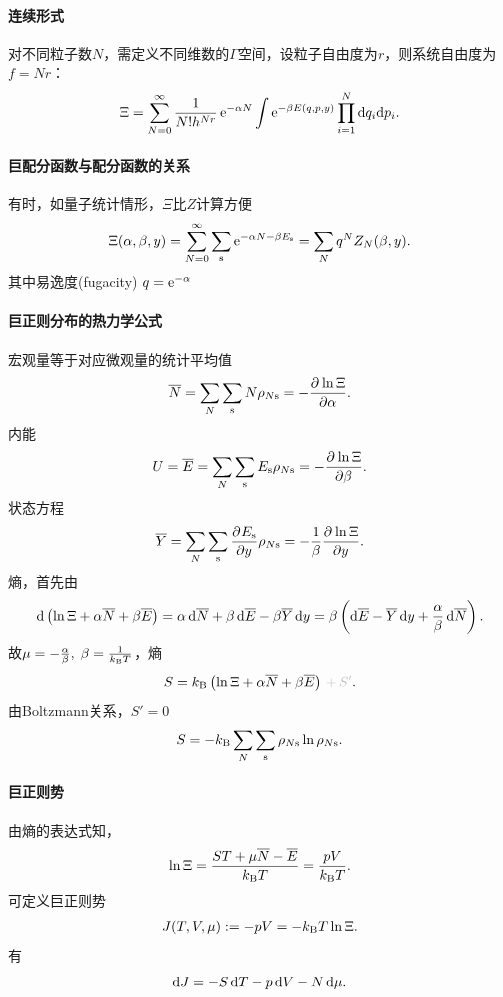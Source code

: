 \paragraph{连续形式}对不同粒子数$N$，需定义不同维数的$\Gamma$空间，设粒子自由度为$r$，则系统自由度为$f=Nr$：
\begin{align}
	\Xi=\sum_{N=0}^\infty\frac1{N!h^{Nr}}\e{-\alpha N}\int\e{-\beta E(q,p,y)}\prod_{i=1}^N\d q_i\nd p_i.
\end{align}
\paragraph{巨配分函数与配分函数的关系}有时，如量子统计情形，$\Xi$比$Z$计算方便
\[
	\Xi(\alpha,\beta,y)=\sum_{N=0}^\infty\sum_\st\e{-\alpha N-\beta E_\st}=\sum_Nq^NZ_N(\beta,y).
\]
其中易逸度(fugacity) $q=\e{-\alpha}$

\paragraph{巨正则分布的热力学公式}宏观量等于对应微观量的统计平均值
\begin{align}
	\avg N=\sum_N\sum_\st N\rho_{N\st}=-\pv{\ln\Xi}\alpha.
\end{align}
内能
\begin{align}
	U=\avg E=\sum_N\sum_\st E_\st\rho_{N\st}=-\pv{\ln\Xi}\beta.
\end{align}
状态方程
\begin{align}
	\avg Y=\sum_N\sum_\st\pv{E_\st}y\rho_{N\st}=-\frac1\beta\pv{\ln\Xi}y.
\end{align}
熵，首先由
\begin{align*}
	\d\kh{\ln\Xi+\alpha\avg N+\beta\avg E}=\alpha\d\avg N+\beta\d\avg E-\beta\avg Y\d y=\beta\kh{\d\avg E-\avg Y\d y+\frac\alpha\beta\d\avg N}.
\end{align*}
故$\mu=-\frac\alpha\beta,\;\beta=\frac1{\kB T}$，熵
\begin{align}
	S=\kB\kh{\ln\Xi+\alpha\avg N+\beta\avg E}{\color{lightgray}\,+\,S'}.
\end{align}
由Boltzmann关系，$S'=0$
\begin{align}
	S=-\kB\sum_N\sum_\st\rho_{N\st}\ln\rho_{N\st}.
\end{align}
\paragraph{巨正则势}
由熵的表达式知，
\[
	\ln\Xi=\frac{ST+\mu\avg N-\avg E}{\kB T}=\frac{pV}{\kB T}.
\]
可定义巨正则势
\begin{align}
	J(T,V,\mu):=-pV=-\kB T\ln\Xi.
\end{align}
有
\[
	\d J=-S\d T-p\d V-N\d\mu.
\]
